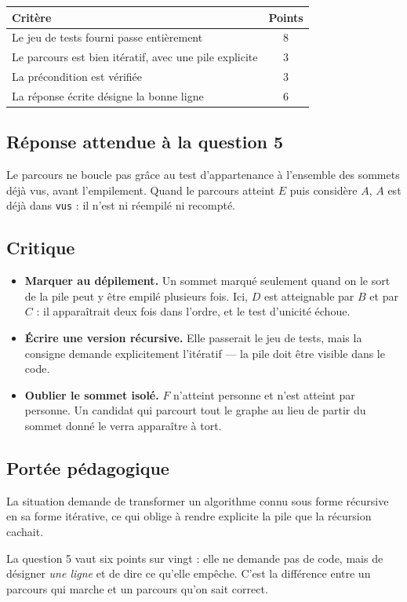 \begin{center}
\begin{tabular}{|l|c|}
\hline
\textbf{Critère} & \textbf{Points} \\
\hline
Le jeu de tests fourni passe entièrement & $8$ \\
\hline
Le parcours est bien itératif, avec une pile explicite & $3$ \\
\hline
La précondition est vérifiée & $3$ \\
\hline
La réponse écrite désigne la bonne ligne & $6$ \\
\hline
\end{tabular}
\end{center}

\subsection*{Réponse attendue à la question 5}

Le parcours ne boucle pas grâce au test d'appartenance à l'ensemble des sommets
déjà vus, avant l'empilement. Quand le parcours atteint $E$ puis considère $A$,
$A$ est déjà dans \lstinline{vus} : il n'est ni réempilé ni recompté.

\subsection*{Critique}

\begin{itemize}
  \item \textbf{Marquer au dépilement.} Un sommet marqué seulement quand on le
    sort de la pile peut y être empilé plusieurs fois. Ici, $D$ est atteignable
    par $B$ et par $C$ : il apparaîtrait deux fois dans l'ordre, et le test
    d'unicité échoue.
  \item \textbf{Écrire une version récursive.} Elle passerait le jeu de tests,
    mais la consigne demande explicitement l'itératif — la pile doit être
    visible dans le code.
  \item \textbf{Oublier le sommet isolé.} $F$ n'atteint personne et n'est
    atteint par personne. Un candidat qui parcourt tout le graphe au lieu de
    partir du sommet donné le verra apparaître à tort.
\end{itemize}

\subsection*{Portée pédagogique}

La situation demande de transformer un algorithme connu sous forme récursive en
sa forme itérative, ce qui oblige à rendre explicite la pile que la récursion
cachait.

La question 5 vaut six points sur vingt : elle ne demande pas de code, mais de
désigner \emph{une ligne} et de dire ce qu'elle empêche. C'est la différence
entre un parcours qui marche et un parcours qu'on sait correct.
